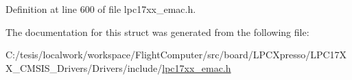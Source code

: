 \-Definition at line 600 of file lpc17xx\-\_\-emac.\-h.



\-The documentation for this struct was generated from the following file\-:\begin{DoxyCompactItemize}
\item 
\-C\-:/tesis/localwork/workspace/\-Flight\-Computer/src/board/\-L\-P\-C\-Xpresso/\-L\-P\-C17\-X\-X\-\_\-\-C\-M\-S\-I\-S\-\_\-\-Drivers/\-Drivers/include/\hyperlink{lpc17xx__emac_8h}{lpc17xx\-\_\-emac.\-h}\end{DoxyCompactItemize}
